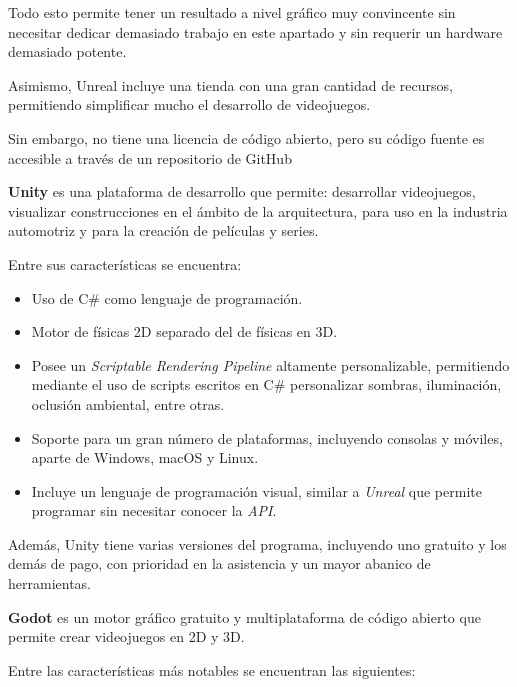 \documentclass[a4paper,11pt]{book}
\begin{document}
Todo esto permite tener un resultado a nivel gráfico muy convincente sin necesitar dedicar demasiado trabajo en este apartado y sin requerir un hardware demasiado potente.

\bigskip

Asimismo, Unreal incluye una tienda con una gran cantidad de recursos, permitiendo simplificar mucho el desarrollo de videojuegos.

\bigskip

Sin embargo, no tiene una licencia de código abierto, pero su código fuente es accesible a través de un repositorio de GitHub %

\bigskip

\textbf{Unity} \cite{unity} es una plataforma de desarrollo que permite: desarrollar videojuegos, visualizar construcciones en el ámbito de la arquitectura, para uso en la industria automotriz y para la creación de películas y series.

\bigskip

Entre sus características se encuentra:

\begin{itemize}
   \item Uso de C\# como lenguaje de programación.
   \item Motor de físicas 2D separado del de físicas en 3D.
   \item Posee un \textit{Scriptable Rendering Pipeline} altamente personalizable, permitiendo mediante el uso de scripts escritos en C\# personalizar sombras, iluminación, oclusión ambiental, entre otras.
   \item Soporte para un gran número de plataformas, incluyendo consolas y móviles, aparte de Windows, macOS y Linux.
   \item Incluye un lenguaje de programación visual, similar a \textit{Unreal} que permite programar sin necesitar conocer la \textit{API}.
\end{itemize}
   
Además, Unity tiene varias versiones del programa, incluyendo uno gratuito y los demás de pago, con prioridad en la asistencia y un mayor abanico de herramientas.

\bigskip

\textbf{Godot} \cite{godot} es un motor gráfico gratuito y multiplataforma de código abierto que permite crear videojuegos en 2D y 3D. 
   
Entre las características más notables se encuentran las siguientes:
\end{document}
